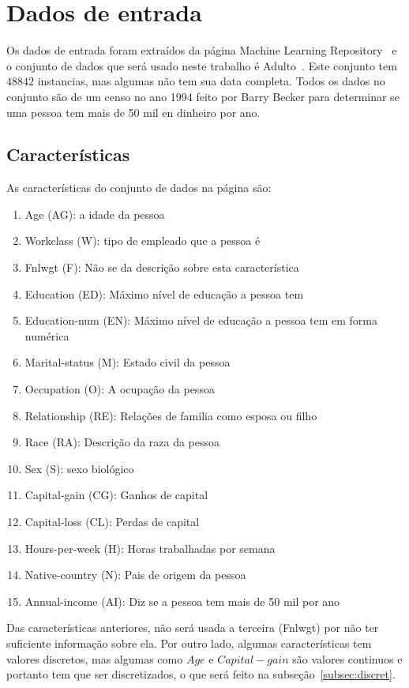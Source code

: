 \section{Dados de entrada}
Os dados de entrada foram extraídos da página Machine Learning Repository~\cite{UCImain} e o conjunto de dados que será usado neste trabalho é Adulto~\cite{UCIadult96}. Este conjunto tem $48842$ instancias, mas algumas não tem sua data completa. Todos os dados no conjunto são de um censo no ano 1994 feito por Barry Becker para determinar se uma pessoa tem mais de 50 mil en dinheiro por ano.

\subsection{Características}
	As características do conjunto de dados na página são:
	\begin{enumerate}
		\item Age (AG): a idade da pessoa
		\item Workclass (W): tipo de empleado que a pessoa é
		\item Fnlwgt (F): Não se da descrição sobre esta característica
		\item Education (ED): Máximo nível de educação a pessoa tem
		\item Education-num (EN): Máximo nível de educação a pessoa tem em forma numérica
		\item Marital-status (M): Estado civil da pessoa
		\item Occupation (O): A ocupação da pessoa
		\item Relationship (RE): Relações de familia como esposa ou filho
		\item Race (RA): Descrição da raza da pessoa
		\item Sex (S): sexo biológico
		\item Capital-gain (CG): Ganhos de capital
		\item Capital-loss (CL): Perdas de capital
		\item Hours-per-week (H): Horas trabalhadas por semana
		\item Native-country (N): Pais de origem da pessoa
		\item Annual-income (AI): Diz se a pessoa tem mais de 50 mil por ano
	\end{enumerate}
	Das características anteriores, não será usada a terceira (Fnlwgt) por não ter suficiente informação sobre ela. Por outro lado, algumas características tem valores discretos, mas algumas como ${Age }$ e ${Capital-gain}$ são valores continuos e portanto tem que ser discretizados, o que será feito na subseção~\ref{subsec:discret}.

